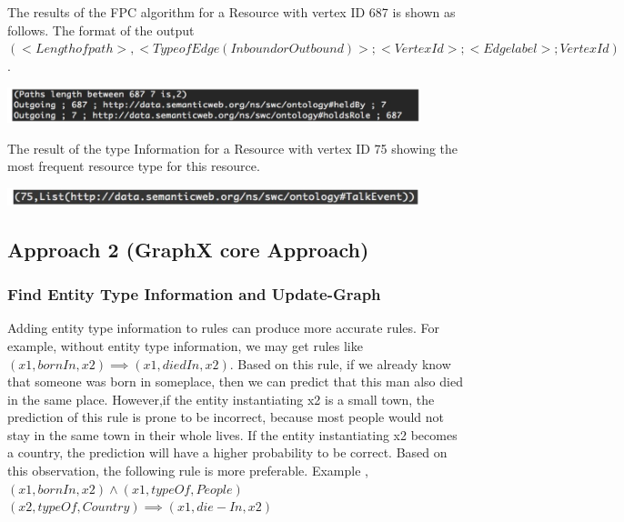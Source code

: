 \documentclass{easychair}
\begin{document}
The results of the FPC algorithm for a Resource with vertex ID 687 is shown as follows. The format of the output  $(<Length of path>, <Type of Edge (Inbound or Outbound )> ; <VertexId> ; <Edge label>; VertexId)$.

\includegraphics[width=0.9\textwidth]{Fpc.png}

The result of the type Information for a Resource with vertex ID 75 showing the most frequent resource type for this resource.

\includegraphics[width=0.9\textwidth]{typeinfo.png}


\subsection{Approach 2 (GraphX core  Approach)}
\subsubsection{Find Entity Type Information and Update-Graph}
Adding entity type information to rules can produce more accurate rules. For example, without entity type information, we may get rules like $(x1, bornIn, x2) \implies (x1, diedIn, x2)$. Based on this rule, if we already know that someone was born in someplace, then we can predict that this man also died in the same place. However,if the entity instantiating x2 is a small town, the prediction of this rule is prone to be incorrect, because most people would not stay in the same town in their whole lives. If the entity instantiating x2 becomes a country, the prediction will have a higher probability to be correct. Based on this observation, the following rule is more preferable.
Example , $(x1, bornIn, x2) \land (x1, typeOf, People)$ \\
$(x2, typeOf,Country) \implies (x1, die-In, x2)$
\end{document}
